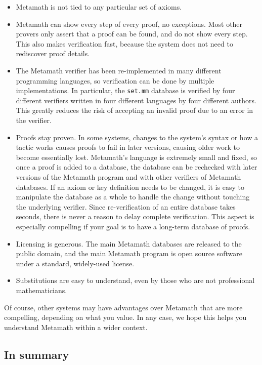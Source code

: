 \begin{itemize}
\item Metamath is not tied to any particular set of axioms.
\item Metamath can show every step of every proof, no exceptions.
  Most other provers only assert that a proof can be found, and do not
  show every step. This also makes verification fast, because
  the system does not need to rediscover proof details.
\item The Metamath verifier has been re-implemented in many different
  programming languages, so verification can be done by multiple
  implementations.  In particular, the
  \texttt{set.mm}%
   database is verified by
  four different verifiers
  written in four different languages by four different authors.
  This greatly reduces the risk of accepting an invalid
  proof due to an error in the verifier.
\item Proofs stay proven.  In some systems, changes to the system's
  syntax or how a tactic works causes proofs to fail in later versions,
  causing older work to become essentially lost.
  Metamath's language is
  extremely small and fixed, so once a proof is added to a database,
  the database can be rechecked with later versions of the Metamath program
  and with other verifiers of Metamath databases.
  If an axiom or key definition needs to be changed, it is easy to
  manipulate the database as a whole to handle the change
  without touching the underlying verifier.
  Since re-verification of an entire database takes seconds, there
  is never a reason to delay complete verification.
  This aspect is especially compelling if your
  goal is to have a long-term database of proofs.
\item Licensing is generous.  The main Metamath databases are released to
  the public domain, and the main Metamath program is open source software
  under a standard, widely-used license.
\item Substitutions are easy to understand, even by those who are not
  professional mathematicians.
\end{itemize}

Of course, other systems may have advantages over Metamath
that are more compelling, depending on what you value.
In any case, we hope this helps you understand Metamath
within a wider context.

\subsection{In summary}\label{computers-summary}


